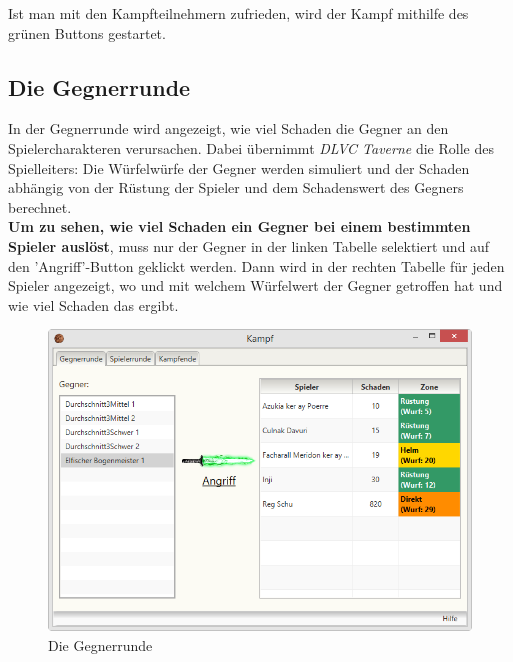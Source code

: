 \documentclass[11pt, a4paper, german]{article}
\begin{document}
Ist man mit den Kampfteilnehmern zufrieden, wird der Kampf mithilfe des grünen Buttons gestartet.
\subsection{Die Gegnerrunde}
In der Gegnerrunde wird angezeigt, wie viel Schaden die Gegner an den Spielercharakteren verursachen. 
Dabei übernimmt \textit{DLVC Taverne} die Rolle des Spielleiters: Die Würfelwürfe der Gegner werden simuliert und der Schaden abhängig von der Rüstung der Spieler und dem Schadenswert des Gegners berechnet.\\

\textbf{Um zu sehen, wie viel Schaden ein Gegner bei einem bestimmten Spieler auslöst}, muss nur der Gegner in der linken Tabelle selektiert und auf den 'Angriff'-Button geklickt werden. Dann wird in der rechten Tabelle für jeden Spieler angezeigt, wo und mit welchem Würfelwert der Gegner getroffen hat und wie viel Schaden das ergibt.
\begin{figure}
\centering
\includegraphics[width=.7\linewidth]{Bilder/Gegnerrunde.png}
\caption{Die Gegnerrunde}
\end{figure}
\end{document}
